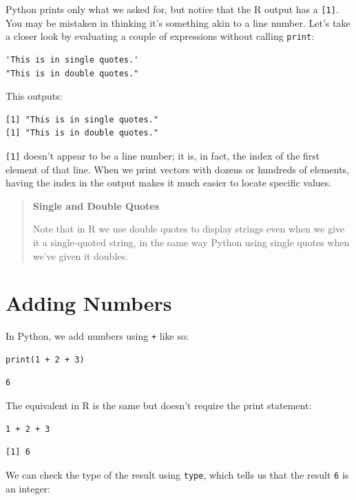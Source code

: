Python prints only what we asked for,
but notice that the R output has a \texttt{[1]}.
You may be mistaken in thinking it's something akin to a line number.
Let's take a closer look by evaluating a couple of expressions without calling \texttt{print}:

\begin{lstlisting}
'This is in single quotes.'
"This is in double quotes."
\end{lstlisting}

This outputs:

\begin{lstlisting}
[1] "This is in single quotes."
[1] "This is in double quotes."
\end{lstlisting}

\texttt{[1]} doesn't appear to be a line number;
it is, in fact, the index of the first element of that line.
When we print vectors with dozens or hundreds of elements,
having the index in the output makes it much easier to locate specific values.

\begin{quote}
\textbf{Single and Double Quotes}

Note that in R we use double quotes to display strings even when we give it a single-quoted string,
in the same way Python using single quotes when we've given it doubles.
\end{quote}

\section{Adding Numbers}

In Python,
we add numbers using \texttt{+} like so:

\begin{lstlisting}
print(1 + 2 + 3)
\end{lstlisting}

\begin{lstlisting}
6
\end{lstlisting}

The equivalent in R is the same but doesn't require the print statement:

\begin{lstlisting}
1 + 2 + 3
\end{lstlisting}

\begin{lstlisting}
[1] 6
\end{lstlisting}

We can check the type of the result using \texttt{type},
which tells us that the result \texttt{6} is an integer:

